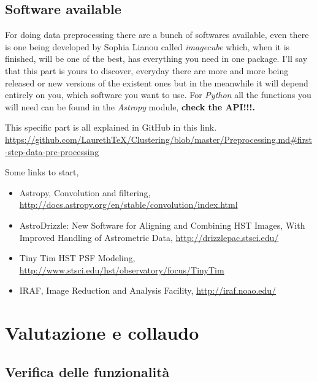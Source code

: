 \documentclass[11pt,fleqn]{book} %
\begin{document}
\section{Software available}
For doing data preprocessing there are a bunch of softwares available, even there is one being developed by Sophia Lianou called \emph{imagecube} which, when it is finished, will be one of the best, has everything you need in one package. I'll say that this part is yours to discover, everyday there are more and more being released or new versions of the existent ones but in the meanwhile it will depend entirely on you, which software you want to use. For \emph{Python} all the functions you will need can be found in the \emph{Astropy} module, \textbf{check the API!!!.}


This specific part is all explained in GitHub in this link. \url{https://github.com/LaurethTeX/Clustering/blob/master/Preprocessing.md#first-step-data-pre-processing}

\begin{remark}
	Some links to start,
    \begin{itemize}
    	\item Astropy, Convolution and filtering, \url{http://docs.astropy.org/en/stable/convolution/index.html}
        \item AstroDrizzle: New Software for Aligning and Combining
HST Images, With Improved Handling of Astrometric Data, \url{http://drizzlepac.stsci.edu/}
		\item Tiny Tim HST PSF Modeling, \url{http://www.stsci.edu/hst/observatory/focus/TinyTim}
        \item IRAF, Image Reduction and Analysis Facility, \url{http://iraf.noao.edu/}
    \end{itemize}
\end{remark}




\chapter{Valutazione e collaudo}

\section{Verifica delle funzionalità}
\end{document}
